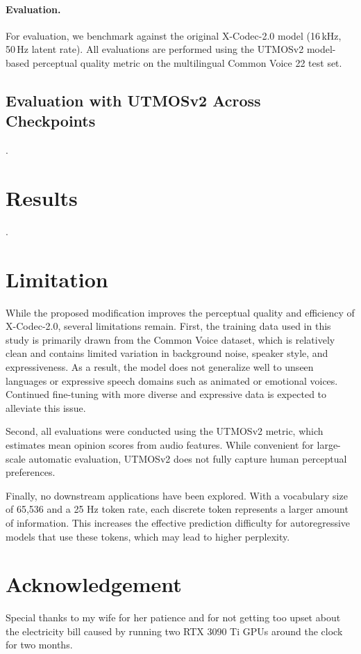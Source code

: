 \documentclass[preprint]{article}
\begin{document}
\paragraph{Evaluation.}
For evaluation, we benchmark against the original X-Codec-2.0 model (16\,kHz, 50\,Hz latent rate).
All evaluations are performed using the UTMOSv2 model-based perceptual quality metric on the multilingual Common Voice 22 test set.

\subsection{Evaluation with UTMOSv2 Across Checkpoints}

.

\section{Results}

.

\section{Limitation}

While the proposed modification improves the perceptual quality and efficiency of X-Codec-2.0, several limitations remain.
First, the training data used in this study is primarily drawn from the Common Voice dataset, which is relatively clean and contains limited variation in background noise, speaker style, and expressiveness. As a result, the model does not generalize well to unseen languages or expressive speech domains such as animated or emotional voices. Continued fine-tuning with more diverse and expressive data is expected to alleviate this issue.

Second, all evaluations were conducted using the UTMOSv2 metric, which estimates mean opinion scores from audio features. While convenient for large-scale automatic evaluation, UTMOSv2 does not fully capture human perceptual preferences.

Finally, no downstream applications have been explored. With a vocabulary size of 65,536 and a 25 Hz token rate, each discrete token represents a larger amount of information. This increases the effective prediction difficulty for autoregressive models that use these tokens, which may lead to higher perplexity.

\section{Acknowledgement}

Special thanks to my wife for her patience and for not getting too upset about the electricity bill
caused by running two RTX 3090 Ti GPUs around the clock for two months.

{}

\end{document}
